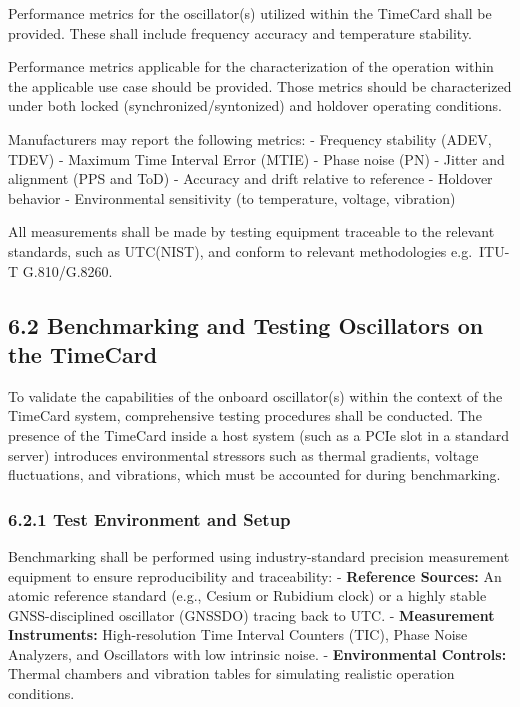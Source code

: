 \documentclass[
]{article}
\begin{document}
Performance metrics for the oscillator(s) utilized within the TimeCard
shall be provided. These shall include frequency accuracy and
temperature stability.

Performance metrics applicable for the characterization of the operation
within the applicable use case should be provided. Those metrics should
be characterized under both locked (synchronized/syntonized) and
holdover operating conditions.

Manufacturers may report the following metrics: - Frequency stability
(ADEV, TDEV) - Maximum Time Interval Error (MTIE) - Phase noise (PN) -
Jitter and alignment (PPS and ToD) - Accuracy and drift relative to
reference - Holdover behavior - Environmental sensitivity (to
temperature, voltage, vibration)

All measurements shall be made by testing equipment traceable to the
relevant standards, such as UTC(NIST), and conform to relevant
methodologies e.g.~ITU-T G.810/G.8260.

\subsection{6.2 Benchmarking and Testing Oscillators on the
TimeCard}\label{benchmarking-and-testing-oscillators-on-the-timecard}

To validate the capabilities of the onboard oscillator(s) within the
context of the TimeCard system, comprehensive testing procedures shall
be conducted. The presence of the TimeCard inside a host system (such as
a PCIe slot in a standard server) introduces environmental stressors
such as thermal gradients, voltage fluctuations, and vibrations, which
must be accounted for during benchmarking.

\subsubsection{6.2.1 Test Environment and
Setup}\label{test-environment-and-setup}

Benchmarking shall be performed using industry-standard precision
measurement equipment to ensure reproducibility and traceability: -
\textbf{Reference Sources:} An atomic reference standard (e.g., Cesium
or Rubidium clock) or a highly stable GNSS-disciplined oscillator
(GNSSDO) tracing back to UTC. - \textbf{Measurement Instruments:}
High-resolution Time Interval Counters (TIC), Phase Noise Analyzers, and
Oscillators with low intrinsic noise. - \textbf{Environmental Controls:}
Thermal chambers and vibration tables for simulating realistic operation
conditions.
\end{document}
